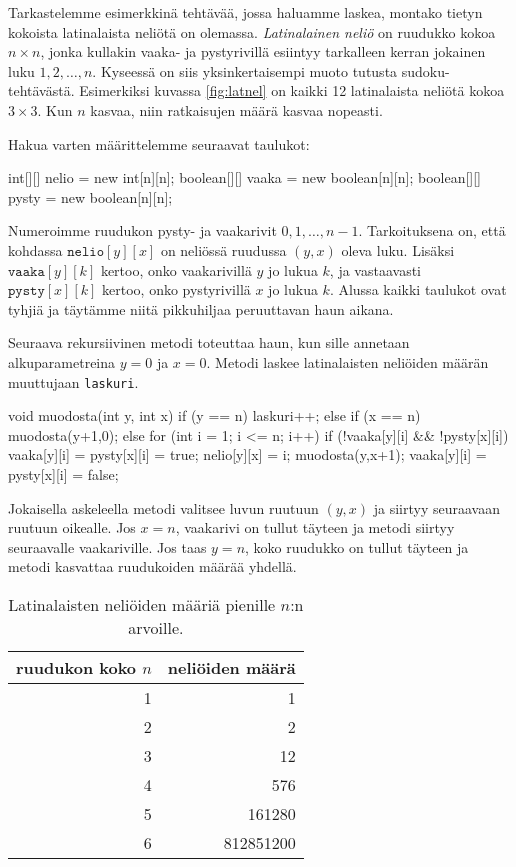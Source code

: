 Tarkastelemme esimerkkinä tehtävää, jossa haluamme laskea,
montako tietyn kokoista latinalaista neliötä on olemassa.
\emph{Latinalainen neliö} on ruudukko kokoa $n \times n$, jonka
kullakin vaaka- ja pystyrivillä esiintyy tarkalleen kerran
jokainen luku $1,2,\dots,n$.
Kyseessä on siis yksinkertaisempi muoto tutusta sudoku-tehtävästä.
Esimerkiksi kuvassa \ref{fig:latnel} on kaikki 12 latinalaista neliötä kokoa $3 \times 3$.
Kun $n$ kasvaa, niin ratkaisujen määrä kasvaa nopeasti.

Hakua varten määrittelemme seuraavat taulukot:

\begin{code}
int[][] nelio = new int[n][n];
boolean[][] vaaka = new boolean[n][n];
boolean[][] pysty = new boolean[n][n];
\end{code}

Numeroimme ruudukon pysty- ja vaakarivit $0,1,\dots,n-1$.
Tarkoituksena on, että kohdassa $\texttt{nelio}[y][x]$
on neliössä ruudussa $(y,x)$ oleva luku.
Lisäksi $\texttt{vaaka}[y][k]$ kertoo, onko vaakarivillä $y$
jo lukua $k$, ja vastaavasti $\texttt{pysty}[x][k]$ kertoo,
onko pystyrivillä $x$ jo lukua $k$.
Alussa kaikki taulukot ovat tyhjiä ja täytämme niitä
pikkuhiljaa peruuttavan haun aikana.

Seuraava rekursiivinen metodi toteuttaa haun, kun sille
annetaan alkuparametreina $y=0$ ja $x=0$.
Metodi laskee latinalaisten neliöiden määrän muuttujaan 
\texttt{laskuri}.

\begin{code}
void muodosta(int y, int x) {
    if (y == n) laskuri++;
    else if (x == n) muodosta(y+1,0);
    else {
        for (int i = 1; i <= n; i++) {
            if (!vaaka[y][i] && !pysty[x][i]) {
                vaaka[y][i] = pysty[x][i] = true;
                nelio[y][x] = i;
                muodosta(y,x+1);
                vaaka[y][i] = pysty[x][i] = false;
            }
        }
    }
}
\end{code}

Jokaisella askeleella metodi valitsee luvun ruutuun
$(y,x)$ ja siirtyy seuraavaan ruutuun oikealle.
Jos $x=n$, vaakarivi on tullut täyteen ja metodi siirtyy
seuraavalle vaakariville.
Jos taas $y=n$, koko ruudukko on tullut täyteen ja
metodi kasvattaa ruudukoiden määrää yhdellä.

\begin{table}
\center
\begin{tabular}{rr}
ruudukon koko $n$ & neliöiden määrä \\
\hline
1 & 1 \\
2 & 2 \\
3 & 12 \\
4 & 576 \\
5 & 161280 \\
6 & 812851200 \\
\end{tabular}
\caption{Latinalaisten neliöiden määriä pienille $n$:n arvoille.}
\label{tab:latnel}
\end{table}

